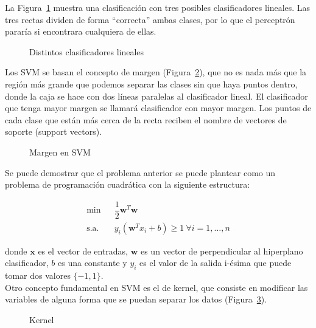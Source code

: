 La Figura~\ref{fig:clasificador} muestra una clasificación con tres posibles clasificadores lineales. Las tres rectas dividen de forma ``correcta'' ambas clases, por lo que el perceptrón pararía si encontrara cualquiera de ellas.\\

\begin{figure}[htbp!]
	\label{fig:clasificador}
	\begin{center}
		\clasificador
	\end{center}
	\caption{Distintos clasificadores lineales}
\end{figure}

Los SVM se basan el concepto de margen (Figura~\ref{fig:margen}), que no es nada más que la región más grande que podemos separar las clases sin que haya puntos dentro, donde la caja se hace con dos líneas paralelas al clasificador lineal. El clasificador que tenga mayor margen se llamará clasificador con mayor margen. Los puntos de cada clase que están más cerca de la recta reciben el nombre de vectores de soporte (support vectors).\\

 \begin{figure}[htbp!]
 	\begin{center}
 		\margen
 	\end{center}
 	\caption{Margen en SVM}
 	\label{fig:margen}
 \end{figure} 
 
 Se puede demostrar que el problema anterior se puede plantear como un problema de programación cuadrática con la siguiente estructura:
 
 \begin{align}
 \min & \ \ \ \dfrac{1}{2}\mathbf{w}^T \mathbf{w}\\
 \text{s.a. } & \ \ \ y_i (\mathbf{w}^T x_i + b) \geq 1 \ \forall i = 1,\dots, n
 \end{align}
 
 donde $\mathbf{x}$ es el vector de entradas, $\mathbf{w}$ es un vector de perpendicular al hiperplano clasificador, $b$ es una constante y $y_i$ es el valor de la salida i-ésima que puede  tomar dos valores $\{-1,1\}$.\\
 
 Otro concepto fundamental en SVM es el de kernel, que consiste en modificar las variables de alguna forma que se puedan separar los datos (Figura~\ref{fig:kernel}).\\
 
\begin{figure}[htbp!]
	\begin{center}
	\end{center}
	\caption{Kernel}
	\label{fig:kernel}
\end{figure} 

